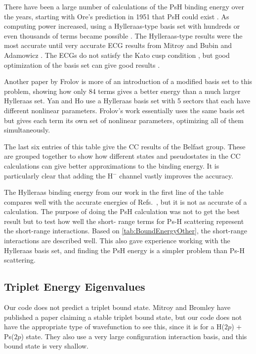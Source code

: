 \documentclass[Dissertation.tex]{subfiles}
\begin{document}
There have been a large number of calculations of the PsH binding energy over 
the years, starting with Ore's prediction in 1951 that PsH could exist
\cite{Ore1951}. As computing power increased, using a Hylleraas-type basis 
set with hundreds or even thousands of terms became possible
\cite{Ho1978,Ho1986,Yan1999,VanReeth2003}. The Hylleraas-type results were 
the most accurate until very accurate ECG results from Mitroy
\cite{Mitroy2006} and Bubin and Adamowicz \cite{Bubin2004,Bubin2006}. The 
ECGs do not satisfy the Kato cusp condition \cite{Kato1957}, but good
optimization of the basis set can give good results \cite{Mitroy2013}.

Another paper by Frolov \cite{Frolov2010} is more of an introduction of a 
modified basis set to this problem, showing how only 84 terms gives a better 
energy than a much larger Hylleraas set. Yan and Ho \cite{Yan1999} use a 
Hylleraas basis set with 5 sectors that each have different nonlinear 
parameters. Frolov's work essentially uses the same basis set but gives each 
term its own set of nonlinear parameters, optimizing all of them 
simultaneously.

The last six entries of this table give the CC results of the Belfast group. 
These are grouped together to show how different states and pseudostates in 
the CC calculations can give better approximations to the binding energy. It 
is particularly clear that adding the H$^-$ channel vastly improves the 
accuracy.

The Hylleraas binding energy from our work in the first line of the table compares
well with the accurate energies of Refs.~\cite{Bubin2006, Mitroy2006, Yan1999},
but it is not as accurate of a calculation. The purpose of doing the PsH 
calculation was not to get the best result but to test how well the short-
range terms for Ps-H scattering represent the short-range interactions. Based 
on \cref{tab:BoundEnergyOther}, the short-range interactions are described 
well. This also gave experience working with the Hylleraas basis set, and 
finding the PsH energy is a simpler problem than Ps-H scattering.

\subsection{Triplet Energy Eigenvalues}
\label{sec:TripletEigenvalues}

Our code does not predict a triplet bound state. Mitroy and Bromley have 
published a paper \cite{Mitroy2007} claiming a stable triplet bound state, 
but our code does not have the appropriate type of wavefunction to see this, 
since it is for a H($2p$) + Ps($2p$) state. They also use a very large 
configuration interaction basis, and this bound state is very shallow. 
\end{document}
